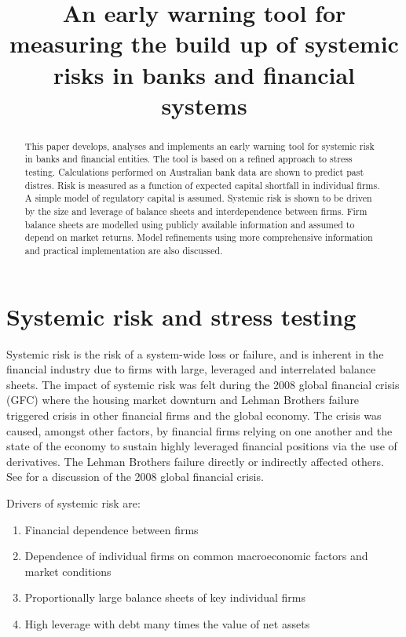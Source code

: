 \documentclass[authoryear]{elsarticle}
\renewcommand{\i}{\item}
\begin{document}
\begin{frontmatter}



\title{An early warning tool for measuring the build up of systemic risks in banks and financial systems}



\begin{abstract}
This paper develops, analyses and implements an early warning tool for  systemic risk in banks and financial entities. The tool is based on a refined approach to stress testing. Calculations performed on Australian bank data are shown to predict past distres. Risk is measured as  a function of expected capital shortfall in individual firms. A simple model of regulatory capital is assumed. Systemic risk is shown to be driven by the size and leverage of balance sheets and interdependence between firms.  Firm balance sheets are modelled using publicly available information and assumed to depend on market returns. Model refinements using more comprehensive information and practical implementation are also discussed.

\end{abstract}

\end{frontmatter}


\newpage

\section{Systemic risk and stress testing}\label{sreview}

Systemic risk is the risk of a system-wide loss or failure, and is inherent in the financial industry due to firms with large, leveraged and interrelated balance sheets. The impact of systemic risk was felt
 during the 2008 global financial crisis (GFC) where the housing market downturn and Lehman Brothers failure triggered crisis in other financial firms and the global economy. The crisis was caused, amongst  other factors, by financial firms relying on one another and the state of the economy to sustain highly leveraged financial positions via the use of derivatives. The Lehman Brothers  failure directly or indirectly affected others. See \cite{kolb2010lessons} for a discussion of the 2008 global financial crisis.


Drivers of systemic risk are:
\begin{enumerate}

\i Financial dependence between firms
\i Dependence of individual firms  on common macroeconomic factors and market conditions
\i Proportionally large balance sheets of key  individual firms
\i High leverage with debt  many times the value of net assets

\end{enumerate}
\end{document}
